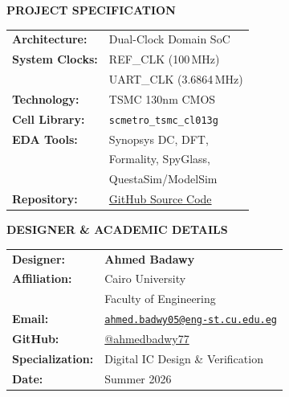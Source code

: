 \documentclass[11pt,a4paper]{article}
\begin{document}
\begin{titlepage}
\noindent
\begin{minipage}[t]{0.48\textwidth}
\begin{tcolorbox}[
    colback=white,
    colframe=cardborder,
    boxrule=0.8pt,
    arc=2mm,
    left=10pt,
    right=10pt,
    top=10pt,
    bottom=10pt,
    height=6.0cm
]
{\small \textbf{\textcolor{primary}{PROJECT SPECIFICATION}}}\\[0.25cm]
\footnotesize
\renewcommand{\arraystretch}{1.3}
\begin{tabularx}{\linewidth}{@{}lY@{}}
\textbf{Architecture:} & Dual-Clock Domain SoC \\
\textbf{System Clocks:} & REF\_CLK (100\,MHz) \\
                        & UART\_CLK (3.6864\,MHz) \\
\textbf{Technology:}    & TSMC 130nm CMOS \\
\textbf{Cell Library:}  & \nolinkurl{scmetro_tsmc_cl013g} \\
\textbf{EDA Tools:}     & Synopsys DC, DFT, \\
                        & Formality, SpyGlass, \\
                        & QuestaSim/ModelSim \\
\textbf{Repository:}    & \href{https://github.com/ahmedbadwy77/Low-Power-Multi-Clock-Digital-Communication-System}{\textcolor{primary}{GitHub Source Code}}
\end{tabularx}
\end{tcolorbox}
\end{minipage}
\hfill
\begin{minipage}[t]{0.48\textwidth}
\begin{tcolorbox}[
    colback=white,
    colframe=cardborder,
    boxrule=0.8pt,
    arc=2mm,
    left=10pt,
    right=10pt,
    top=10pt,
    bottom=10pt,
    height=6.0cm
]
{\small \textbf{\textcolor{accent}{DESIGNER \& ACADEMIC DETAILS}}}\\[0.25cm]
\footnotesize
\renewcommand{\arraystretch}{1.3}
\begin{tabularx}{\linewidth}{@{}lY@{}}
\textbf{Designer:}      & \textbf{Ahmed Badawy} \\
\textbf{Affiliation:}   & Cairo University \\
                        & Faculty of Engineering \\
\textbf{Email:}         & \href{mailto:ahmed.badwy05@eng-st.cu.edu.eg}{{\scriptsize\nolinkurl{ahmed.badwy05@eng-st.cu.edu.eg}}} \\
\textbf{GitHub:}        & \href{https://github.com/ahmedbadwy77}{\textcolor{primary}{@ahmedbadwy77}} \\
\textbf{Specialization:}& Digital IC Design \& Verification \\
\textbf{Date:}          & Summer 2026
\end{tabularx}
\end{tcolorbox}
\end{minipage}


\end{titlepage}
\end{document}
